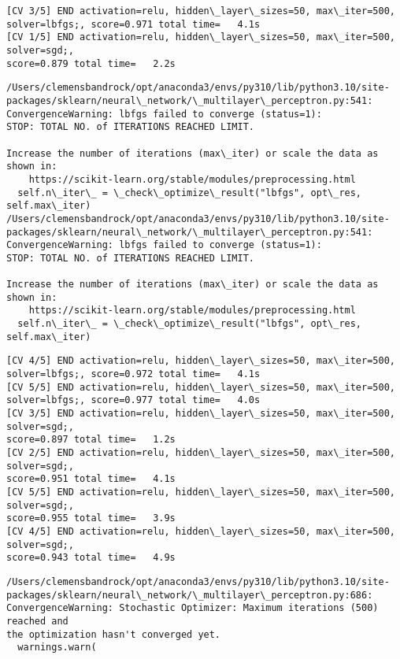 \documentclass[11pt]{article}
\begin{document}
    \begin{Verbatim}[commandchars=\\\{\}]
[CV 3/5] END activation=relu, hidden\_layer\_sizes=50, max\_iter=500,
solver=lbfgs;, score=0.971 total time=   4.1s
[CV 1/5] END activation=relu, hidden\_layer\_sizes=50, max\_iter=500, solver=sgd;,
score=0.879 total time=   2.2s
    \end{Verbatim}

    \begin{Verbatim}[commandchars=\\\{\}]
/Users/clemensbandrock/opt/anaconda3/envs/py310/lib/python3.10/site-
packages/sklearn/neural\_network/\_multilayer\_perceptron.py:541:
ConvergenceWarning: lbfgs failed to converge (status=1):
STOP: TOTAL NO. of ITERATIONS REACHED LIMIT.

Increase the number of iterations (max\_iter) or scale the data as shown in:
    https://scikit-learn.org/stable/modules/preprocessing.html
  self.n\_iter\_ = \_check\_optimize\_result("lbfgs", opt\_res, self.max\_iter)
/Users/clemensbandrock/opt/anaconda3/envs/py310/lib/python3.10/site-
packages/sklearn/neural\_network/\_multilayer\_perceptron.py:541:
ConvergenceWarning: lbfgs failed to converge (status=1):
STOP: TOTAL NO. of ITERATIONS REACHED LIMIT.

Increase the number of iterations (max\_iter) or scale the data as shown in:
    https://scikit-learn.org/stable/modules/preprocessing.html
  self.n\_iter\_ = \_check\_optimize\_result("lbfgs", opt\_res, self.max\_iter)
    \end{Verbatim}

    \begin{Verbatim}[commandchars=\\\{\}]
[CV 4/5] END activation=relu, hidden\_layer\_sizes=50, max\_iter=500,
solver=lbfgs;, score=0.972 total time=   4.1s
[CV 5/5] END activation=relu, hidden\_layer\_sizes=50, max\_iter=500,
solver=lbfgs;, score=0.977 total time=   4.0s
[CV 3/5] END activation=relu, hidden\_layer\_sizes=50, max\_iter=500, solver=sgd;,
score=0.897 total time=   1.2s
[CV 2/5] END activation=relu, hidden\_layer\_sizes=50, max\_iter=500, solver=sgd;,
score=0.951 total time=   4.1s
[CV 5/5] END activation=relu, hidden\_layer\_sizes=50, max\_iter=500, solver=sgd;,
score=0.955 total time=   3.9s
[CV 4/5] END activation=relu, hidden\_layer\_sizes=50, max\_iter=500, solver=sgd;,
score=0.943 total time=   4.9s
    \end{Verbatim}

    \begin{Verbatim}[commandchars=\\\{\}]
/Users/clemensbandrock/opt/anaconda3/envs/py310/lib/python3.10/site-
packages/sklearn/neural\_network/\_multilayer\_perceptron.py:686:
ConvergenceWarning: Stochastic Optimizer: Maximum iterations (500) reached and
the optimization hasn't converged yet.
  warnings.warn(
    \end{Verbatim}
\end{document}
